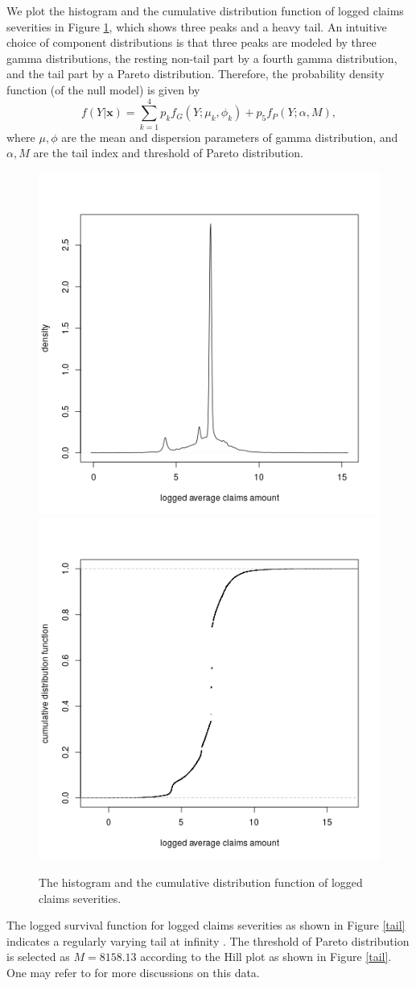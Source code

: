 \documentclass[11pt]{article}
\numberwithin{equation}{section}
\def\bx{\boldsymbol{x}}
\begin{document}
We plot the histogram and the cumulative distribution function of logged claims severities in Figure \ref{hist}, which shows three peaks and a heavy tail. 
An intuitive choice of component distributions is that 
three peaks are modeled by three gamma distributions, the resting non-tail part by a fourth gamma distribution, and the tail part by a Pareto distribution.
Therefore, the probability density function (of the null model) is given by
\begin{equation}\label{sev-0}
	f(Y|\bx)=\sum_{k=1}^4p_kf_{G}(Y;\mu_k,\phi_k)+p_5f_{P}(Y;\alpha,M),
\end{equation}
	where $\mu,\phi$ are the mean and dispersion parameters of gamma distribution, and $\alpha, M$ are the tail index and threshold of Pareto distribution. 
\begin{figure}[h!]
	\centering
	\includegraphics[width=0.4\linewidth]{../plots/sev/hist.png}
	\includegraphics[width=0.4\linewidth]{../plots/sev/cdf.png}
	\caption{The histogram and the cumulative distribution function of logged claims severities.}\label{hist}
\end{figure}

	The logged survival function for logged claims severities as shown in Figure \ref{tail} indicates a regularly varying  tail at infinity \citep{embrechts2013modeling}.
	The threshold of Pareto distribution is selected as $M=8158.13$ according to the Hill plot \citep{resnick1997heavy} as shown in Figure \ref{tail}. One may refer to \citet{wuthrich2022statistical} for more discussions on this data.
	
\end{document}
